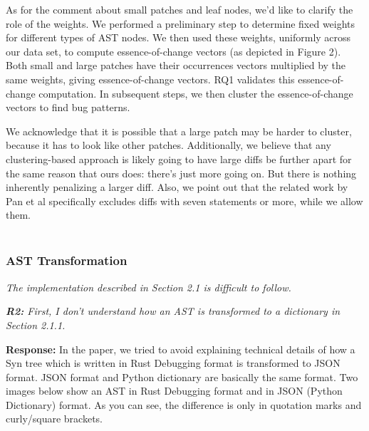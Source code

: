 \documentclass{article}
\begin{document}
As for the comment about small patches and leaf nodes, we'd like to clarify the role of the weights. We performed a preliminary step to determine fixed weights for different types of AST nodes. We then used these weights, uniformly across our data set, to compute essence-of-change vectors (as depicted in Figure 2). Both small and large patches have their occurrences vectors multiplied by the same weights, giving essence-of-change vectors. RQ1 validates this essence-of-change computation. In subsequent steps, we then cluster the essence-of-change vectors to find bug patterns. 

We acknowledge that it is possible that a large patch may be harder to cluster, because it has to look like other patches.  Additionally, we believe that any clustering-based approach is likely going to have large diffs be further apart for the same reason that ours does: there's just more going on. But there is nothing inherently penalizing a larger diff. Also, we point out that the related work by Pan et al specifically excludes diffs with seven statements or more, while we allow them. \\ \\

\subsubsection{\label{rev:2:ast}AST Transformation}

\vspace*{1em} \noindent \textit{The implementation described in Section 2.1 is difficult to follow.}

\vspace*{1em} \noindent \textit{\textbf{R2:} First, I don't understand how an AST is transformed to a dictionary in Section 2.1.1.}

\vspace*{1em} \noindent \textbf{Response:} In the paper, we tried to avoid explaining technical details of how a Syn tree which is written in Rust Debugging format is transformed to JSON format. JSON format and Python dictionary are basically the same format. Two images below show an AST in Rust Debugging format and in JSON (Python Dictionary) format. As you can see, the difference is only in quotation marks and curly/square brackets.
\end{document}
